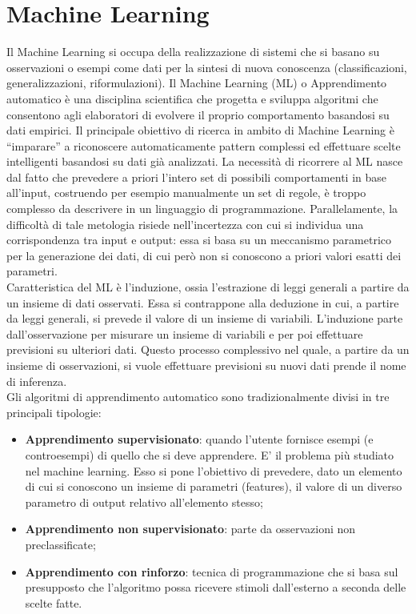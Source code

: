 \section{Machine Learning}
Il Machine Learning si occupa della realizzazione di sistemi che si basano su osservazioni o esempi come dati per la sintesi di nuova conoscenza (classificazioni, generalizzazioni, riformulazioni). Il Machine Learning (ML) o Apprendimento automatico è una disciplina scientifica che progetta e sviluppa algoritmi che consentono agli elaboratori di evolvere il proprio comportamento basandosi su dati empirici. Il principale obiettivo di ricerca in ambito di Machine Learning è “imparare” a riconoscere automaticamente pattern complessi ed effettuare scelte intelligenti basandosi su dati già analizzati. La necessità di ricorrere al ML nasce dal fatto che prevedere a priori l'intero set di possibili comportamenti in base all'input, costruendo per esempio manualmente un set di regole, è troppo complesso da descrivere in un linguaggio di programmazione. Parallelamente, la difficoltà di tale metologia risiede nell'incertezza con cui si individua una corrispondenza tra input e output: essa si basa su un meccanismo parametrico per la generazione dei dati, di cui però non si conoscono a priori valori esatti dei parametri.\\
Caratteristica del ML è l'induzione, ossia l’estrazione di leggi generali a partire da un insieme di dati osservati. Essa si contrappone alla deduzione in cui, a partire da leggi generali, si prevede il valore di un insieme di variabili. L’induzione parte dall’osservazione per misurare un insieme di variabili e per poi effettuare previsioni su ulteriori dati. Questo processo complessivo nel quale, a partire da un insieme di osservazioni, si vuole effettuare previsioni su nuovi dati prende il nome di inferenza.\\
Gli algoritmi di apprendimento automatico sono tradizionalmente divisi in tre principali tipologie:
\begin{itemize}
	\item \textbf{Apprendimento supervisionato}: quando l'utente fornisce esempi (e controesempi) di quello che si deve apprendere. E' il problema più studiato	nel machine learning. Esso si pone l’obiettivo di prevedere, dato un
	elemento di cui si conoscono un insieme di parametri (features), il valore di un diverso parametro di output relativo all’elemento stesso;
	\item \textbf{Apprendimento non supervisionato}: parte da osservazioni non preclassificate;
	\item \textbf{Apprendimento con rinforzo}: tecnica di programmazione che si basa sul 	presupposto che l'algoritmo possa ricevere stimoli dall'esterno a seconda
	delle scelte fatte.
\end{itemize}
